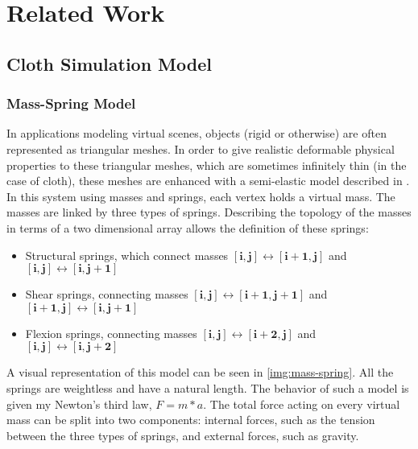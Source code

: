 \chapter{Related Work}
\label{sec:sota}



\section{Cloth Simulation Model}
\label{sec:csm}

\subsection{Mass-Spring Model}
\label{sub-sec:msm}

In applications modeling virtual scenes, objects (rigid or otherwise) are often represented as triangular meshes. In order to give realistic deformable physical properties to these triangular meshes, which are sometimes infinitely thin (in the case of cloth), these meshes are enhanced with a semi-elastic model described in \citep{provot95}. In this system using masses and springs, each vertex holds a virtual mass. The masses are linked by three types of springs. Describing the topology of the masses in terms of a two dimensional array allows the definition of these springs:

\begin{itemize}
	\item Structural springs, which connect masses $\mathbf{[i, j] \leftrightarrow [i + 1, j]}$ and $\mathbf{[i, j] \leftrightarrow [i,j + 1]}$
	\item Shear springs, connecting masses $\mathbf{[i, j] \leftrightarrow [i + 1, j + 1]}$ and $\mathbf{[i + 1, j] \leftrightarrow [i, j + 1]}$
	\item Flexion springs, connecting masses $\mathbf{[i, j] \leftrightarrow [i + 2, j]}$ and $\mathbf{[i, j] \leftrightarrow [i, j + 2]}$
\end{itemize}

A visual representation of this model can be seen in \autoref{img:mass-spring}. All the springs are weightless and have a natural length. The behavior of such a model is given my Newton's third law, $F = m * a$. The total force acting on every virtual mass can be split into two components: internal forces, such as the tension between the three types of springs, and external forces, such as gravity.


